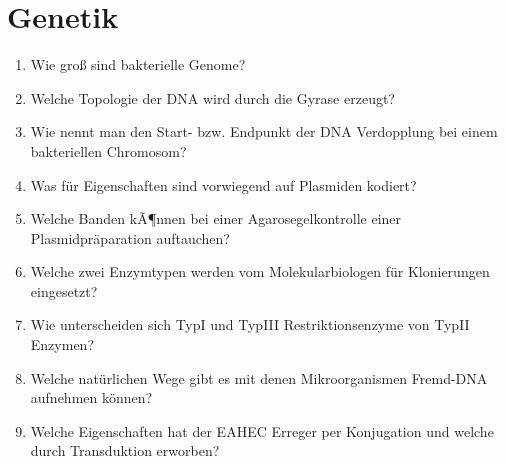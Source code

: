 \section{Genetik}

\begin{enumerate}
		        \item Wie groß sind bakterielle Genome?
			\item Welche Topologie der DNA wird durch die Gyrase erzeugt?
			\item Wie nennt man den Start- bzw. Endpunkt der DNA Verdopplung bei einem bakteriellen Chromosom?
			\item Was f\"ur Eigenschaften sind vorwiegend auf Plasmiden kodiert?
			\item Welche Banden kÃ¶nnen bei einer Agarosegelkontrolle einer Plasmidpr\"aparation auftauchen?
			\item Welche zwei Enzymtypen werden vom Molekularbiologen f\"ur Klonierungen eingesetzt?
			\item Wie unterscheiden sich TypI und TypIII Restriktionsenzyme von TypII Enzymen?
			\item Welche nat\"urlichen Wege gibt es mit denen Mikroorganismen Fremd-DNA aufnehmen k\"onnen?
			\item Welche Eigenschaften hat der EAHEC Erreger per Konjugation und welche durch Transduktion erworben?
\end{enumerate}

